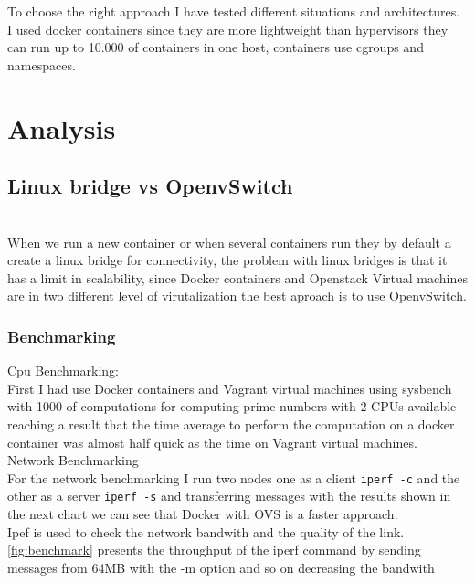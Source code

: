 To choose the right approach I have tested different situations and architectures.
I used docker containers since they are more lightweight than hypervisors they can run up to 10.000 of containers in one host, containers use cgroups and namespaces.\\

\section{Analysis}
\subsection{Linux bridge vs OpenvSwitch}\\

When we run a new container or when several containers run they by default a create a linux bridge for connectivity, the problem with linux bridges is that it has a limit in scalability, since Docker containers and Openstack Virtual machines are in two different level of virutalization the best aproach is to use OpenvSwitch.\\

\subsubsection{Benchmarking}

Cpu Benchmarking:\\

First I had use Docker containers and Vagrant virtual machines using sysbench  with  1000 of computations for computing prime numbers with 2 CPUs available reaching a result that the time average to perform the computation on a docker container was almost half quick as the time on Vagrant virtual machines.\\

Network Benchmarking \\

For the network benchmarking I run two nodes one as a client \texttt{iperf -c} and the other as a server \texttt{iperf -s} and transferring messages with the results shown in the next chart we can see that Docker with OVS is a faster approach.\\

Ipef is used to check the network bandwith and the quality of the link.\\

\autoref{fig:benchmark} presents the throughput of the iperf command by sending messages from 64MB with the -m option and so on decreasing the bandwith 

